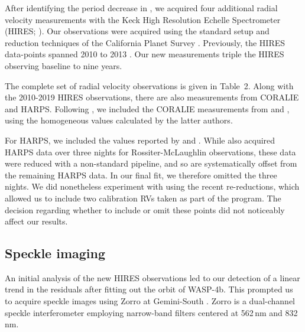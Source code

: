 \documentclass[12pt,twocolumn,tighten]{aastex62}
\begin{document}
After identifying the period decrease in
, we acquired four additional radial
velocity measurements with the Keck High Resolution Echelle
Spectrometer (HIRES; \citealt{vogt_hires_1994}).  Our observations
were acquired using the standard setup and reduction techniques of the
California Planet Survey \citep{howard_cps_2010}.  Previously, the
HIRES data-points spanned 2010 to 2013 \citep{knutson_friends_2014}.
Our new measurements triple the HIRES observing baseline to nine
years.

The complete set of radial velocity observations is given in Table~2.
Along with the 2010-2019 HIRES observations, there are also
measurements from CORALIE and HARPS.  Following
, we included the CORALIE measurements
from \citet{wilson_wasp-4b_2008} and \citet{triaud_spin-orbit_2010},
using the homogeneous values calculated by the latter authors.

For HARPS, we included the values reported by
\citet{pont_determining_2011} and \citet{husnoo_observational_2012}.
While \citet{triaud_spin-orbit_2010} also acquired HARPS data over
three nights for Rossiter-McLaughlin observations, these data were
reduced with a non-standard pipeline, and so are systematically offset
from the remaining HARPS data.  In our final fit, we therefore omitted
the three \citet{triaud_spin-orbit_2010} nights.  We did nonetheless
experiment with using the recent \citet{trifonov_public_2020}
re-reductions, which allowed us to include two calibration RVs taken
as part of the \citet{triaud_spin-orbit_2010} program. The decision
regarding whether to include or omit these points did not
noticeably affect our results.


\subsection{Speckle imaging}

An initial analysis of the new HIRES observations led to our detection
of a linear trend in the residuals after fitting out the orbit of
WASP-4b.  This prompted us to acquire speckle images using Zorro at
Gemini-South \citep[see][and the instrument
web-pages\footnote{\url{www.gemini.edu/sciops/instruments/alopeke-zorro/}}]{scott_nessi_2018}.
Zorro is a dual-channel speckle interferometer employing narrow-band
filters centered at 562$\,$nm and 832$\,$nm.  
\end{document}
